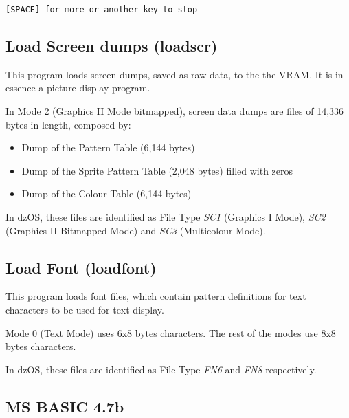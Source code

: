 \documentclass[a4paper,11pt]{article}
\begin{document}
    \hspace{1cm}\texttt{[SPACE] for more or another key to stop}

    \subsection{Load Screen dumps (loadscr)}
    This program loads screen dumps, saved as raw data, to the the VRAM. It is
    in essence a picture display program.

    In Mode 2 (Graphics II Mode bitmapped), screen data dumps are files of
    14,336 bytes in length, composed by:
    \begin{itemize}
        \item Dump of the Pattern Table (6,144 bytes)
        \item Dump of the Sprite Pattern Table (2,048 bytes) filled with zeros
        \item Dump of the Colour Table (6,144 bytes)
    \end{itemize}

    In dzOS, these files are identified as File Type \textit{SC1}
    (Graphics I Mode), \textit{SC2} (Graphics II Bitmapped Mode) and
    \textit{SC3} (Multicolour Mode).

    \subsection{Load Font (loadfont)}
    This program loads font files, which contain pattern definitions for text
    characters to be used for text display.

    Mode 0 (Text Mode) uses 6x8 bytes characters. The rest of the modes use 8x8
    bytes characters.
    
    In dzOS, these files are identified as File Type \textit{FN6} and
    \textit{FN8} respectively.

    \subsection{MS BASIC 4.7b}
    
\end{document}

